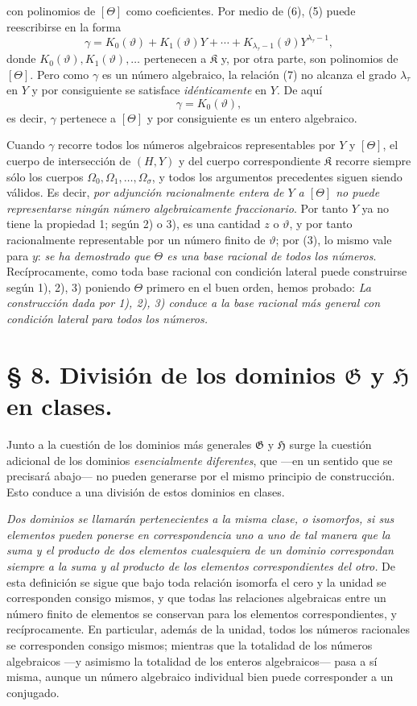 \documentclass[11pt]{article}
\begin{document}
con polinomios de $[\Theta]$ como coeficientes. Por medio de (6), (5) puede reescribirse en la forma
\begin{equation}
\gamma=K_0(\vartheta)+K_1(\vartheta)Y+\cdots+
K_{\lambda_\tau-1}(\vartheta)Y^{\lambda_\tau-1},
\tag{7}
\end{equation}
donde $K_0(\vartheta),K_1(\vartheta),\ldots$ pertenecen a $\mathfrak K$ y, por otra parte, son polinomios de $[\Theta]$. Pero como $\gamma$ es un número algebraico, la relación (7) no alcanza el grado $\lambda_\tau$ en $Y$ y por consiguiente se satisface \emph{idénticamente} en $Y$. De aquí
\[
 \gamma=K_0(\vartheta),
\]
es decir, $\gamma$ pertenece a $[\Theta]$ y por consiguiente es un entero algebraico.

Cuando $\gamma$ recorre todos los números algebraicos representables por $Y$ y $[\Theta]$, el cuerpo de intersección de $(H,Y)$ y del cuerpo correspondiente $\mathfrak K$ recorre siempre sólo los cuerpos $\Omega_0,\Omega_1,\ldots,\Omega_\sigma$, y todos los argumentos precedentes siguen siendo válidos. Es decir, \emph{por adjunción racionalmente entera de $Y$ a $[\Theta]$ no puede representarse ningún número algebraicamente fraccionario}. Por tanto $Y$ ya no tiene la propiedad 1; según 2) o 3), es una cantidad $z$ o $\vartheta$, y por tanto racionalmente representable por un número finito de $\vartheta$; por (3), lo mismo vale para $y$: \emph{se ha demostrado que $\Theta$ es una base racional de todos los números}. Recíprocamente, como toda base racional con condición lateral puede construirse según 1), 2), 3) poniendo $\Theta$ primero en el buen orden, hemos probado: \emph{La construcción dada por 1), 2), 3) conduce a la base racional más general con condición lateral para todos los números.}

\section*{§ 8. División de los dominios $\mathfrak G$ y $\mathfrak H$ en clases.}

Junto a la cuestión de los dominios más generales $\mathfrak G$ y $\mathfrak H$ surge la cuestión adicional de los dominios \emph{esencialmente diferentes}, que ---en un sentido que se precisará abajo--- no pueden generarse por el mismo principio de construcción. Esto conduce a una división de estos dominios en clases.

\emph{Dos dominios se llamarán pertenecientes a la misma clase, o isomorfos, si sus elementos pueden ponerse en correspondencia uno a uno de tal manera que la suma y el producto de dos elementos cualesquiera de un dominio correspondan siempre a la suma y al producto de los elementos correspondientes del otro.} De esta definición se sigue que bajo toda relación isomorfa el cero y la unidad se corresponden consigo mismos, y que todas las relaciones algebraicas entre un número finito de elementos se conservan para los elementos correspondientes, y recíprocamente. En particular, además de la unidad, todos los números racionales se corresponden consigo mismos; mientras que la totalidad de los números algebraicos ---y asimismo la totalidad de los enteros algebraicos--- pasa a sí misma, aunque un número algebraico individual bien puede corresponder a un conjugado.
\end{document}
